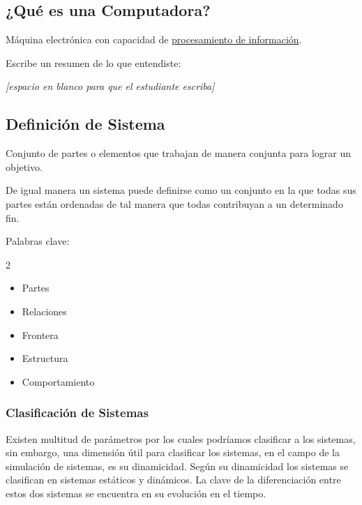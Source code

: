 \documentclass[11pt,letterpaper]{report}
\newcommand{\espacio}{\par\noindent\textit{[espacio en blanco para que el estudiante escriba]}\par}
\begin{document}
\subsection*{¿Qué es una Computadora?}

Máquina electrónica con capacidad de \underline{procesamiento de información}.

\begin{center}
\end{center}

Escribe un resumen de lo que entendiste:
\espacio

\subsection*{Definición de Sistema}

Conjunto de partes o elementos que trabajan de manera conjunta para lograr un objetivo.

De igual manera un sistema puede definirse como un conjunto en la que todas sus partes están ordenadas de tal manera que todas contribuyan a un determinado fin.

Palabras clave:
\begin{multicols}{2}
\begin{itemize}
\item Partes
\item Relaciones
\item Frontera
\item Estructura
\item Comportamiento
\end{itemize}
\end{multicols}

\subsubsection*{Clasificación de Sistemas}

Existen multitud de parámetros por los cuales podríamos clasificar a los sistemas, sin embargo, una dimensión útil para clasificar los sistemas, en el campo de la simulación de sistemas, es su dinamicidad. Según su dinamicidad los sistemas se clasifican en sistemas estáticos y dinámicos. La clave de la diferenciación entre estos dos sistemas se encuentra en su evolución en el tiempo.
\end{document}
